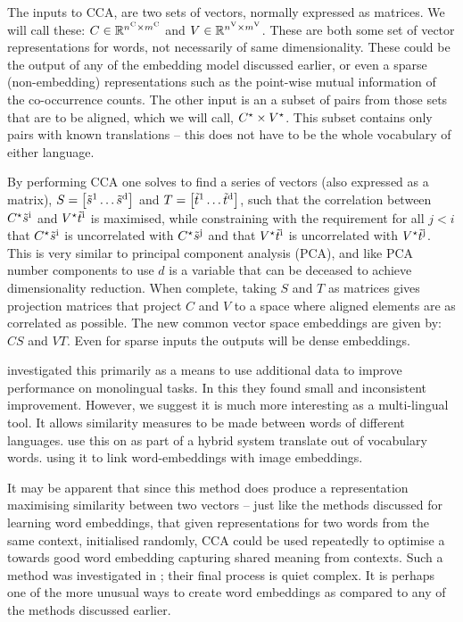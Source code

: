 \documentclass[parskip]{komatufte}
\begin{document}
The inputs to CCA, are two sets of vectors, normally expressed as matrices.
We will call these:
$C \in \mathbb{R}^{\d n_C \times \d m_C}$ and $V \in \mathbb{R}^{\d n_V \times \d m_V}$.
These are both some set of vector representations for words, not necessarily of same dimensionality.
These could be the output of any of the embedding model discussed earlier,
or even a sparse (non-embedding) representations such as the point-wise mutual information of the co-occurrence counts.
The other input is an a subset of pairs from those sets that are to be aligned, which we will call, $\d C_\star \times \d V_\star$.
This subset contains only pairs with known translations -- this does not have to be the whole vocabulary of either language.


%
By performing CCA one solves to find a series of vectors (also expressed as a matrix), $S=\left[ \dv s_1 \ldots \dv s_d \right]$ and $T= \left[ \dv t_1 \ldots \dv t_d \right]$,
such that the correlation between $\d C_\star \dv s_i$ and $\d V_\star \dv t_i$ is maximised,
while constraining with the requirement for all $j<i$ that $\d C_\star \dv s_i$ is uncorrelated with $\d C_\star \dv s_j$  and that  $ \d V_\star \dv t_i$ is uncorrelated with $\d V_\star \dv t_j$.
This is very similar to principal component analysis (PCA), and like PCA number components to use $d$ is a variable that can be deceased to achieve dimensionality reduction.
When complete, taking $S$ and $T$ as matrices gives projection matrices that project $C$ and $V$ to a space where aligned elements are as correlated as possible.
The new common vector space embeddings are given by:
$C S$ and $V T$.
Even for sparse inputs the outputs will be dense embeddings.

\textcite{faruqui2014improving} investigated this primarily as a means to use additional data to improve performance on monolingual tasks.
In this they found small and inconsistent improvement.
However, we suggest it is much more interesting as a multi-lingual tool.
It allows similarity measures to be made between words of different languages.
 use this on as part of a hybrid system translate out of vocabulary words.
 using it to link word-embeddings with image embeddings.


It may be apparent that since this method does produce a representation maximising similarity between two vectors -- just like the methods discussed for learning word embeddings,
that given representations for two words from the same context, initialised randomly,
CCA could be used repeatedly to optimise a towards good word embedding capturing shared meaning from contexts.
Such a method was investigated in ; their final process is quiet complex.
It is perhaps one of the more unusual ways to create word embeddings as compared to any of the methods discussed earlier.
\end{document}
